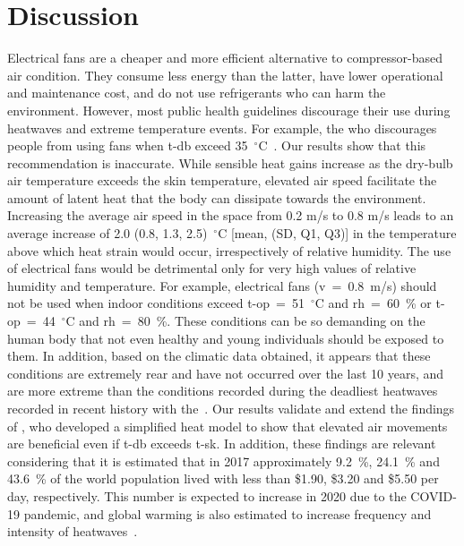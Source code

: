 
\section{Discussion}\label{sec:discussion}

Electrical fans are a cheaper and more efficient alternative to compressor-based air condition.
They consume less energy than the latter, have lower operational and maintenance cost, and do not use refrigerants who can harm the environment.
However, most public health guidelines discourage their use during heatwaves and extreme temperature events.
For example, the \ac{who} discourages people from using fans when \acf{t-db} exceed 35~$^{\circ}$C~\cite{WMO2015}.
Our results show that this recommendation is inaccurate.
While sensible heat gains increase as the dry-bulb air temperature exceeds the skin temperature, elevated air speed facilitate the amount of latent heat that the body can dissipate towards the environment.
Increasing the average air speed in the space from 0.2 m/s to 0.8 m/s leads to an average increase of 2.0 (0.8, 1.3, 2.5)~$^{\circ}$C [mean, (SD, Q1, Q3)] in the temperature above which heat strain would occur, irrespectively of relative humidity.
The use of electrical fans would be detrimental only for very high values of relative humidity and temperature.
For example, electrical fans (\ac{v}~=~0.8~m/s) should not be used when indoor conditions exceed \ac{t-op}~=~51~$^{\circ}$C and \ac{rh}~=~60~\% or \ac{t-op}~=~44~$^{\circ}$C and \ac{rh}~=~80~\%.
These conditions can be so demanding on the human body that not even healthy and young individuals should be exposed to them.
In addition, based on the climatic data obtained, it appears that these conditions are extremely rear and have not occurred over the last 10 years, and are more extreme than the conditions recorded during the deadliest heatwaves recorded in recent history with the~\cite{WMO2015}.
Our results validate and extend the findings of , who developed a simplified heat model to show that elevated air movements are beneficial even if \ac{t-db} exceeds \acf{t-sk}.
In addition, these findings are relevant considering that it is estimated that in 2017 approximately 9.2~\%, 24.1~\% and 43.6~\% of the world population lived with less than \$1.90, \$3.20 and \$5.50 per day, respectively.
This number is expected to increase in 2020 due to the COVID-19 pandemic, and global warming is also estimated to increase frequency and intensity of heatwaves~\cite{PovertyO1:online}.
